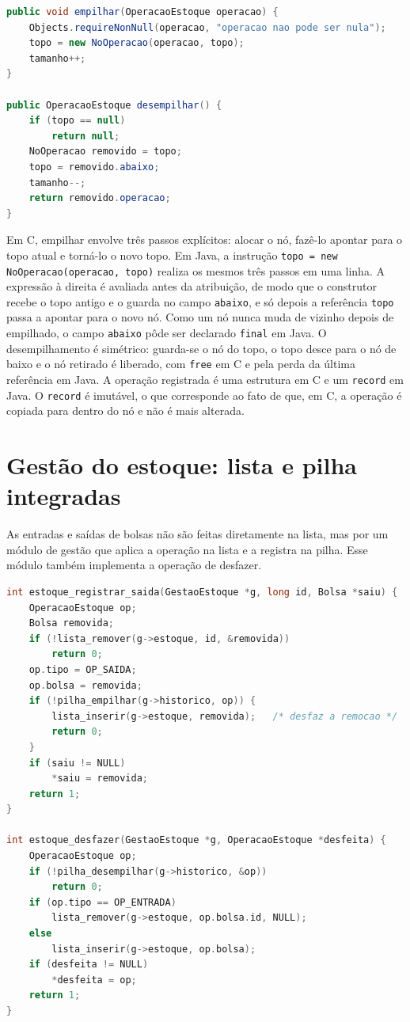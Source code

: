 \documentclass[12pt,a4paper,oneside]{report}
\newcommand{\fonte}[1][Elaborado pelos autores (2026).]{\par\vspace{2pt}{\centering\small Fonte: #1\par}\vspace{6pt}}
\newcommand{\cod}[1]{\texttt{#1}}
\begin{document}
\begin{lstlisting}[language=Java,caption={Empilhar e desempilhar operações, em Java (\cod{PilhaHistorico.java})},label=cod:pilha-java]
public void empilhar(OperacaoEstoque operacao) {
    Objects.requireNonNull(operacao, "operacao nao pode ser nula");
    topo = new NoOperacao(operacao, topo);
    tamanho++;
}

public OperacaoEstoque desempilhar() {
    if (topo == null)
        return null;
    NoOperacao removido = topo;
    topo = removido.abaixo;
    tamanho--;
    return removido.operacao;
}
\end{lstlisting}
\fonte

Em C, empilhar envolve três passos explícitos: alocar o nó, fazê-lo apontar para o topo atual e torná-lo o novo topo. Em Java, a instrução \cod{topo = new NoOperacao(operacao, topo)} realiza os mesmos três passos em uma linha. A expressão à direita é avaliada antes da atribuição, de modo que o construtor recebe o topo antigo e o guarda no campo \cod{abaixo}, e só depois a referência \cod{topo} passa a apontar para o novo nó. Como um nó nunca muda de vizinho depois de empilhado, o campo \cod{abaixo} pôde ser declarado \cod{final} em Java. O desempilhamento é simétrico: guarda-se o nó do topo, o topo desce para o nó de baixo e o nó retirado é liberado, com \cod{free} em C e pela perda da última referência em Java. A operação registrada é uma estrutura em C e um \cod{record} em Java. O \cod{record} é imutável, o que corresponde ao fato de que, em C, a operação é copiada para dentro do nó e não é mais alterada.

\section{Gestão do estoque: lista e pilha integradas}

As entradas e saídas de bolsas não são feitas diretamente na lista, mas por um módulo de gestão que aplica a operação na lista e a registra na pilha. Esse módulo também implementa a operação de desfazer.

\begin{lstlisting}[language=C,caption={Registro de saída e desfazer, em C (\cod{gestao\_estoque.c})},label=cod:gestao-c]
int estoque_registrar_saida(GestaoEstoque *g, long id, Bolsa *saiu) {
    OperacaoEstoque op;
    Bolsa removida;
    if (!lista_remover(g->estoque, id, &removida))
        return 0;
    op.tipo = OP_SAIDA;
    op.bolsa = removida;
    if (!pilha_empilhar(g->historico, op)) {
        lista_inserir(g->estoque, removida);   /* desfaz a remocao */
        return 0;
    }
    if (saiu != NULL)
        *saiu = removida;
    return 1;
}

int estoque_desfazer(GestaoEstoque *g, OperacaoEstoque *desfeita) {
    OperacaoEstoque op;
    if (!pilha_desempilhar(g->historico, &op))
        return 0;
    if (op.tipo == OP_ENTRADA)
        lista_remover(g->estoque, op.bolsa.id, NULL);
    else
        lista_inserir(g->estoque, op.bolsa);
    if (desfeita != NULL)
        *desfeita = op;
    return 1;
}
\end{lstlisting}
\fonte
\end{document}
